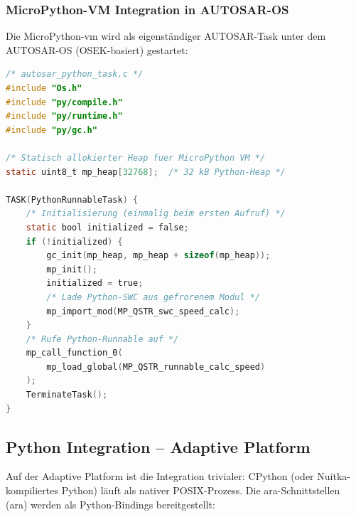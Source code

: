 ﻿\documentclass[12pt,a4paper,twoside]{article}
\begin{document}
\subsubsection{MicroPython-VM Integration in AUTOSAR-OS}

Die MicroPython-\gls{vm} wird als eigenständiger AUTOSAR-Task unter
dem AUTOSAR-OS (OSEK-basiert) gestartet:

\begin{lstlisting}[language=C,caption={MicroPython VM als AUTOSAR-OS-Task},label=lst:mpy_task]
/* autosar_python_task.c */
#include "Os.h"
#include "py/compile.h"
#include "py/runtime.h"
#include "py/gc.h"

/* Statisch allokierter Heap fuer MicroPython VM */
static uint8_t mp_heap[32768];  /* 32 kB Python-Heap */

TASK(PythonRunnableTask) {
    /* Initialisierung (einmalig beim ersten Aufruf) */
    static bool initialized = false;
    if (!initialized) {
        gc_init(mp_heap, mp_heap + sizeof(mp_heap));
        mp_init();
        initialized = true;
        /* Lade Python-SWC aus gefrorenem Modul */
        mp_import_mod(MP_QSTR_swc_speed_calc);
    }
    /* Rufe Python-Runnable auf */
    mp_call_function_0(
        mp_load_global(MP_QSTR_runnable_calc_speed)
    );
    TerminateTask();
}
\end{lstlisting}

\subsection{Python Integration -- Adaptive Platform}
\label{subsec:ap_integration}

Auf der Adaptive Platform ist die Integration trivialer:
CPython (oder Nuitka-kompiliertes Python) läuft als nativer POSIX-Prozess.
Die ara-Schnittstellen (\gls{ara}) werden als Python-Bindings bereitgestellt:
\end{document}
